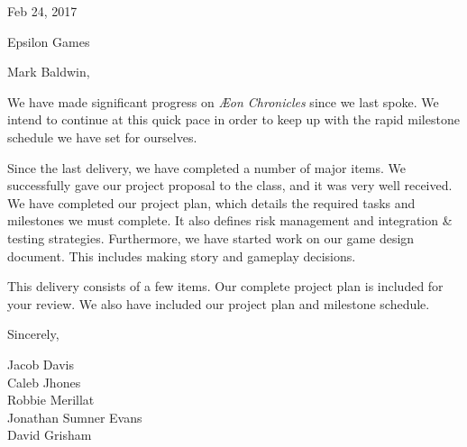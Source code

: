 \documentclass[12pt]{article}
\newcommand\tab[1][.5in]{\hspace*{#1}}
\begin{document}
\hfill Feb 24, 2017

\hfill Epsilon Games

Mark Baldwin,

We have made significant progress on \textit{{\AE}on Chronicles} since we last
spoke. We intend to continue at this quick pace in order to keep up with the
rapid milestone schedule we have set for ourselves.

Since the last delivery, we have completed a number of major items. We
successfully gave our project proposal to the class, and it was very well
received. We have completed our project plan, which details the required
tasks and milestones we must complete. It also defines risk management
and integration \& testing strategies. Furthermore, we have started work on
our game design document. This includes making story and gameplay decisions.

This delivery consists of a few items. Our complete project plan is included
for your review. We also have included our project plan and milestone schedule.

Sincerely,

\tab Jacob Davis \\
\tab Caleb Jhones \\
\tab Robbie Merillat \\
\tab Jonathan Sumner Evans \\
\tab David Grisham \\
\end{document}

